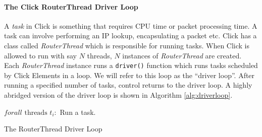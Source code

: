 \documentclass[a4paper,marginparwidth=50pt,marginparsep=10pt]{article}
\begin{document}
\paragraph{The Click RouterThread Driver Loop}
A \emph{task} in Click is something that requires CPU time or packet processing time. A task can involve performing an IP lookup, encapsulating a packet etc. Click has a class called \emph{RouterThread} which is responsible for running tasks. When Click is allowed to run with say $N$ threads, $N$ instances of \emph{RouterThread} are created. Each \emph{RouterThread} instance runs a \verb+driver()+ function which runs tasks scheduled by Click Elements in a loop. We will refer to this loop as the ``driver loop''. After running a specified number of tasks, control returns to the driver loop. A highly abridged version of the driver loop is shown in Algorithm \ref{alg:driverloop}.


\begin{algorithm}[float=tph]
\begin{algorithmic}
{
\STATE $forall \mbox{ threads }t_i:$
\STATE Run a task.
\ENDWHILE
}
\caption{The RouterThread Driver Loop}
\label{alg:driverloop}
\end{algorithmic}
\end{algorithm}
\end{document}

